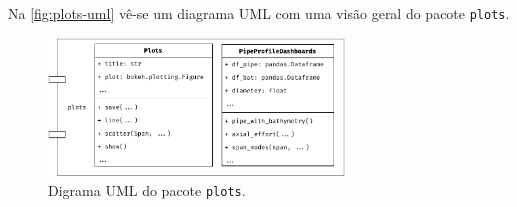 Na \autoref{fig:plots-uml} vê-se um diagrama UML com uma visão geral do pacote \texttt{plots}.

\begin{figure}[!ht]
    \centering
    \caption{Digrama UML do pacote \texttt{plots}.}\label{fig:plots-uml}
    \includegraphics[width=0.7\textwidth]{imagens/plots-uml}
\end{figure}
